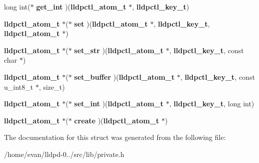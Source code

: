 \begin{DoxyCompactItemize}
\item 
long int($\ast$ {\bfseries get\-\_\-int} )({\bf lldpctl\-\_\-atom\-\_\-t} $\ast$, {\bf lldpctl\-\_\-key\-\_\-t})\label{structlldpctl__atom__t_a6daa5d14018b2226425d675867e40bd7}

\item 
{\bf lldpctl\-\_\-atom\-\_\-t} $\ast$($\ast$ {\bfseries set} )({\bf lldpctl\-\_\-atom\-\_\-t} $\ast$, {\bf lldpctl\-\_\-key\-\_\-t}, {\bf lldpctl\-\_\-atom\-\_\-t} $\ast$)\label{structlldpctl__atom__t_afe734b0f5f76782c6236dc0fd895f515}

\item 
{\bf lldpctl\-\_\-atom\-\_\-t} $\ast$($\ast$ {\bfseries set\-\_\-str} )({\bf lldpctl\-\_\-atom\-\_\-t} $\ast$, {\bf lldpctl\-\_\-key\-\_\-t}, const char $\ast$)\label{structlldpctl__atom__t_a6dd98361f1f4ea8433ee9b2d752db187}

\item 
{\bf lldpctl\-\_\-atom\-\_\-t} $\ast$($\ast$ {\bfseries set\-\_\-buffer} )({\bf lldpctl\-\_\-atom\-\_\-t} $\ast$, {\bf lldpctl\-\_\-key\-\_\-t}, const u\-\_\-int8\-\_\-t $\ast$, size\-\_\-t)\label{structlldpctl__atom__t_adf5a98fbbae11849b14b253021d91abb}

\item 
{\bf lldpctl\-\_\-atom\-\_\-t} $\ast$($\ast$ {\bfseries set\-\_\-int} )({\bf lldpctl\-\_\-atom\-\_\-t} $\ast$, {\bf lldpctl\-\_\-key\-\_\-t}, long int)\label{structlldpctl__atom__t_aed050470869bf0cf991e3d9f1be3be76}

\item 
{\bf lldpctl\-\_\-atom\-\_\-t} $\ast$($\ast$ {\bfseries create} )({\bf lldpctl\-\_\-atom\-\_\-t} $\ast$)\label{structlldpctl__atom__t_aa92676b300c234435cce6ead72d89616}

\end{DoxyCompactItemize}


\-The documentation for this struct was generated from the following file\-:\begin{DoxyCompactItemize}
\item 
/home/evan/lldpd-\/0../src/lib/private.\-h\end{DoxyCompactItemize}
